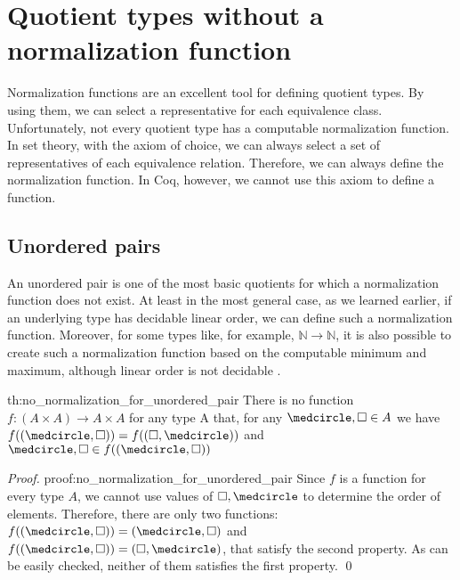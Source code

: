 \section{Quotient types without a normalization function}
Normalization functions are an excellent tool for defining quotient types. By using them, we can select a representative for each equivalence class. Unfortunately, not every quotient type has a computable normalization function. In set theory, with the axiom of choice, we can always select a set of representatives of each equivalence relation. Therefore, we can always define the normalization function. In Coq, however, we cannot use this axiom to define a function. 

\subsection{Unordered pairs}
An unordered pair is one of the most basic quotients for which a normalization function does not exist. At least in the most general case, as we learned earlier, if an underlying type has decidable linear order, we can define such a normalization function. Moreover, for some types like, for example, $\mathbb{N} \rightarrow \mathbb{N}$, it is also possible to create such a normalization function based on the computable minimum and maximum, although linear order is not decidable \cite{DefinableQuotients}.

\begin{theo}{}{th:no_normalization_for_unordered_pair}
There is no function $f: (A \times A) \rightarrow A \times A$ for any type A that, for any $\medcircle , \square \in A$ we have $f((\medcircle , \square)) = f((\square, \medcircle))$ and $\medcircle , \square \in f((\medcircle , \square))$ 
\end{theo}

\begin{proof}{}{proof:no_normalization_for_unordered_pair}
Since $f$ is a function for every type $A$, we cannot use values of $\square, \medcircle$ to determine the order of elements. Therefore, there are only two functions: $f((\medcircle , \square)) = (\medcircle , \square)$ and $f((\medcircle , \square)) = (\square , \medcircle)$, that satisfy the second property. As can be easily checked, neither of them satisfies the first property. \qed
\end{proof}

